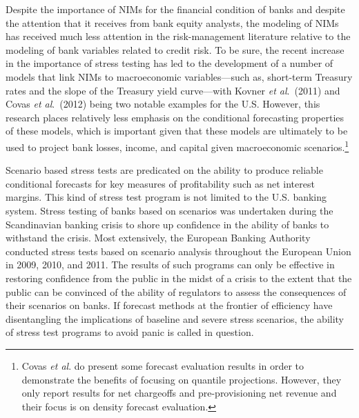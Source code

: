 \documentclass[11pt]{article}
\renewcommand{\baselinestretch}{1.5}
\begin{document}
Despite the importance of NIMs for the financial condition of banks and despite the attention that it receives from bank equity analysts, the modeling of NIMs has received much less attention in the risk-management literature relative to the modeling of bank variables related to credit risk.  To be sure, the recent increase in the importance of stress testing has led to the development of a number of models that link NIMs to macroeconomic variables---such as, short-term Treasury rates and the slope of the Treasury yield curve---with Kovner \textit{et al}.~(2011) and Covas \textit{et al}.~(2012) being two notable examples for the U.S.  However, this research places relatively less emphasis on the conditional forecasting properties of these models, which is important given that these models are ultimately to be used to project bank losses, income, and capital given macroeconomic scenarios.\renewcommand{\baselinestretch}{1}\footnote{Covas \textit{et al}. do present some forecast evaluation results in order to demonstrate the benefits of focusing on quantile projections. However, they only report results for net chargeoffs and pre-provisioning net revenue and their focus is on density forecast evaluation.\vspace{0.05in}}\renewcommand{\baselinestretch}{1.5}

Scenario based stress tests are predicated on the ability to produce reliable conditional forecasts for key measures of profitability such as net interest margins. This kind of stress test program is not limited to the U.S. banking system. Stress testing of banks based on scenarios was undertaken during the Scandinavian banking crisis to shore up confidence in the ability of banks to withstand the crisis. Most extensively, the European Banking Authority conducted stress tests based on scenario analysis throughout the European Union in 2009, 2010, and 2011. The results of such programs can only be effective in restoring confidence from the public in the midst of a crisis to the extent that the public can be convinced of the ability of regulators to assess the consequences of their scenarios on banks. If forecast methods at the frontier of efficiency have disentangling the implications of baseline and severe stress scenarios, the ability of stress test programs to avoid panic is called in question.

\end{document}
